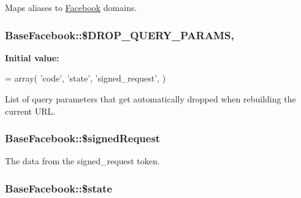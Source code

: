 Maps aliases to \hyperlink{classFacebook}{Facebook} domains. \hypertarget{classBaseFacebook_a463779b23fc993650d18af395979501d}{
\subsubsection[{\$\-D\-R\-O\-P\-\_\-\-Q\-U\-E\-R\-Y\-\_\-\-P\-A\-R\-A\-M\-S}]{\setlength{\rightskip}{0pt plus 5cm}Base\-Facebook\-::\$\-D\-R\-O\-P\-\_\-\-Q\-U\-E\-R\-Y\-\_\-\-P\-A\-R\-A\-M\-S\hspace{0.3cm}{\ttfamily [static]}, {\ttfamily [protected]}}}\label{classBaseFacebook_a463779b23fc993650d18af395979501d}
{\bfseries Initial value\-:}
\begin{DoxyCode}
= array(
    \textcolor{stringliteral}{'code'},
    \textcolor{stringliteral}{'state'},
    \textcolor{stringliteral}{'signed\_request'},
  )
\end{DoxyCode}
List of query parameters that get automatically dropped when rebuilding the current U\-R\-L. \hypertarget{classBaseFacebook_a90c6ec44757d540ffe1539f512af7469}{
\subsubsection[{\$signed\-Request}]{\setlength{\rightskip}{0pt plus 5cm}Base\-Facebook\-::\$signed\-Request\hspace{0.3cm}{\ttfamily [protected]}}}\label{classBaseFacebook_a90c6ec44757d540ffe1539f512af7469}
The data from the signed\-\_\-request token. \hypertarget{classBaseFacebook_a8c3903cc0e9a12c87dfae721648491a2}{
\subsubsection[{\$state}]{\setlength{\rightskip}{0pt plus 5cm}Base\-Facebook\-::\$state\hspace{0.3cm}{\ttfamily [protected]}}}\label{classBaseFacebook_a8c3903cc0e9a12c87dfae721648491a2}
